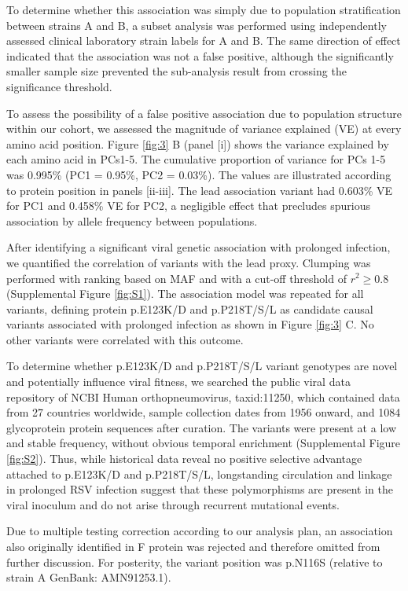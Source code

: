 \documentclass{article} %
\begin{document}
To determine whether this association was simply due to population stratification between strains A and B, a subset analysis was performed using independently assessed clinical laboratory strain labels for A and B. The same direction of effect indicated that the association was not a false positive, although the significantly smaller sample size prevented the sub-analysis result from crossing the significance threshold.

To assess the possibility of a false positive association due to population structure within our cohort, we assessed the magnitude of variance explained (VE) at every amino acid position. Figure \ref{fig:3} B (panel [i]) shows the variance explained by each amino acid in PCs1-5. The cumulative proportion of variance for PCs 1-5 was 0.995\% (PC1 = 0.95\%, PC2 = 0.03\%). The values are illustrated according to protein position in panels [ii-iii]. The lead association variant had 0.603\% VE for PC1 and 0.458\% VE for PC2, a negligible effect that precludes spurious association by allele frequency between populations.

After identifying a significant viral genetic association with prolonged infection, we quantified the correlation of variants with the lead proxy. Clumping was performed with ranking based on MAF and with a cut-off threshold of $r^2 \ge 0.8$ (Supplemental Figure \ref{fig:S1}). The association model was repeated for all variants, defining protein p.E123K/D and p.P218T/S/L as candidate causal variants associated with prolonged infection as shown in Figure \ref{fig:3} C. No other variants were correlated with this outcome.

To determine whether p.E123K/D and p.P218T/S/L variant genotypes are novel and potentially influence viral fitness, we searched the public viral data repository of NCBI Human orthopneumovirus, taxid:11250, which contained data from 27 countries worldwide, sample collection dates from 1956 onward, and 1084 glycoprotein protein sequences after curation. The variants were present at a low and stable frequency, without obvious temporal enrichment (Supplemental Figure \ref{fig:S2}). Thus, while historical data reveal no positive selective advantage attached to p.E123K/D and p.P218T/S/L, longstanding circulation and linkage in prolonged RSV infection suggest that these polymorphisms are present in the viral inoculum and do not arise through recurrent mutational events.

Due to multiple testing correction according to our analysis plan, an association also originally identified in F protein was rejected and therefore omitted from further discussion. For posterity, the variant position was p.N116S (relative to strain A GenBank: AMN91253.1).
\end{document}
